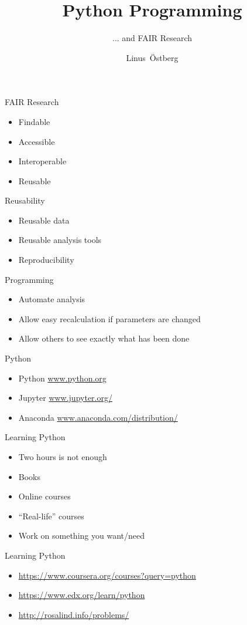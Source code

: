 \documentclass{beamer}%
\title{Python Programming}
\subtitle{... and FAIR Research}
\author{Linus~Östberg}
\institute{\url{https://github.com/talavis/biomed-bioinf}}
\date{}
\begin{document}
 \begin{frame}
  \maketitle
 \end{frame}
 
 \begin{frame}{FAIR Research}
  \begin{itemize}
   \item Findable
   \item Accessible
   \item Interoperable
   \item Reusable
  \end{itemize}
 \end{frame}

 \begin{frame}{Reusability}
  \begin{itemize}
   \item Reusable data
   \item Reusable analysis tools
   \item Reproducibility
  \end{itemize}
 \end{frame}

 \begin{frame}{Programming}
  \begin{itemize}
   \item Automate analysis
   \item Allow easy recalculation if parameters are changed
   \item Allow others to see exactly what has been done
  \end{itemize}
 \end{frame}

 
 
 \begin{frame}{Python}
  \begin{itemize}
   \item<1> Python \url{www.python.org}
   \item<1> Jupyter \url{www.jupyter.org/}
   \item<1-2> Anaconda \url{www.anaconda.com/distribution/}
  \end{itemize}
 \end{frame}

 \begin{frame}{Learning Python}
  \begin{itemize}
   \item Two hours is not enough
   \item Books
   \item Online courses
   \item ``Real-life'' courses
   \item Work on something you want/need
  \end{itemize}
 \end{frame}

 \begin{frame}{Learning Python}
  \begin{itemize}
   \item \url{https://www.coursera.org/courses?query=python}
   \item \url{https://www.edx.org/learn/python}
   \item \url{http://rosalind.info/problems/}
  \end{itemize}
 \end{frame}

 
\end{document}

